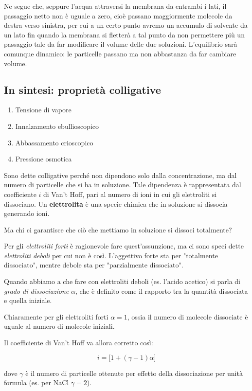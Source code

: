 Ne segue che, seppure l'acqua attraversi la membrana da entrambi i lati, il passaggio netto non è uguale a zero, cioè passano maggiormente molecole da destra verso sinistra, per cui a un certo punto avremo un accumulo di solvente da un lato fin quando la membrana si fletterà a tal punto da non permettere più un passaggio tale da far modificare il volume delle due soluzioni. L'equilibrio sarà comunque dinamico: le particelle passano ma non abbastanza da far cambiare volume.

\subsection{In sintesi: proprietà colligative}
\begin{enumerate}
    \item Tensione di vapore
    \item Innalzamento ebullioscopico
    \item Abbassamento crioscopico
    \item Pressione osmotica
\end{enumerate}
Sono dette colligative perché non dipendono solo dalla concentrazione, ma dal numero di particelle che si ha in soluzione. Tale dipendenza è rappresentata dal coefficiente $i$ di Van't Hoff, pari al numero di ioni in cui gli elettroliti si dissociano. Un \textbf{elettrolita} è una specie chimica che in soluzione si dissocia generando ioni.

Ma chi ci garantisce che ciò che mettiamo in soluzione si dissoci totalmente?

Per gli \textit{elettroliti forti} è ragionevole fare quest'assunzione, ma ci sono speci dette \textit{elettroliti deboli} per cui non è così. L'aggettivo forte sta per "totalmente dissociato", mentre debole sta per "parzialmente dissociato".

Quando abbiamo a che fare con elettroliti deboli (es. l'acido acetico) si parla di \textit{grado di dissociazione} $\alpha$, che è definito come il rapporto tra la quantità dissociata e quella iniziale.

Chiaramente per gli elettroliti forti $\alpha=1$, ossia il numero di molecole dissociate è uguale al numero di molecole iniziali.

Il coefficiente di Van't Hoff va allora corretto così:

$$i=\big[1 + (\gamma - 1)\alpha \big]$$

dove $\gamma$ è il numero di particelle ottenute per effetto della dissociazione per unità formula (es. per NaCl $\gamma=2$).

